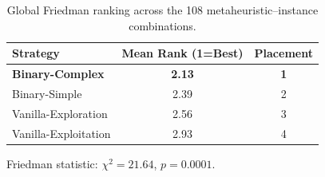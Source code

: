 \begin{table}[htbp]
  \centering
  \caption{Global Friedman ranking across the 108 metaheuristic--instance combinations.}
  \label{tab:friedman_all_instances}
  \begin{tabular}{lcc}
    \toprule
    \textbf{Strategy} &
    \textbf{Mean Rank (1=Best)} &
    \textbf{Placement} \\
    \midrule
    \textbf{Binary-Complex}          & \textbf{2.13} & \textbf{1} \\
    Binary-Simple                    &   2.39 &  2 \\
    Vanilla-Exploration              &   2.56 &  3 \\
    Vanilla-Exploitation             &   2.93 &  4 \\
    \bottomrule
  \end{tabular}
  \vspace{1ex}

  \footnotesize Friedman statistic:
  $\chi^2=21.64$, $p=0.0001$.
\end{table}
